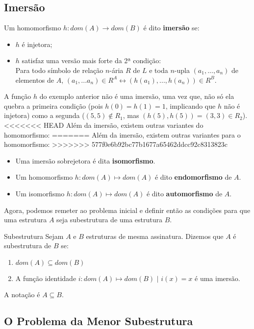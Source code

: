 \subsection{Imersão}
Um homomorfismo $h: dom(A) \rightarrow dom(B)$ é dito \textbf{imersão} se:
\begin{itemize}
    \item $h$ é injetora;
    \item $h$ satisfaz uma versão mais forte da 2ª condição:
    \\ Para todo símbolo de relação $n$-ária $R$ de $L$ e toda $n$-upla $(a_1,...,a_n)$ de elementos de $A$, $(a_1,...a_n) \in R^A \leftrightarrow (h(a_1),...,h(a_n)) \in R^B$.
\end{itemize}
A função $h$ do exemplo anterior não é uma imersão, uma vez que, não só ela quebra a primeira condição (pois $h(0) = h(1) = 1$, implicando que $h$ não é injetora) como a segunda ($(5,5) \notin R_1$, mas $(h(5),h(5)) = (3,3) \in R_2$).
<<<<<<< HEAD
Além da imersão, existem outras variantes do homomorfismo:
=======
Além da imersão, existem outras variantes para o homomorfismo:
>>>>>>> 577f0e6b92bc77b1677a65462ddcc92c8313823c
\begin{itemize}
    \item Uma imersão sobrejetora é dita \textbf{isomorfismo}.
    \item Um homomorfismo $h: dom(A) \mapsto dom(A)$ é dito \textbf{endomorfismo} de $A$.
    \item Um isomorfismo $h: dom(A) \mapsto dom(A)$ é dito \textbf{automorfismo} de $A$.
\end{itemize}

Agora, podemos remeter ao problema inicial e definir então as condições para que uma estrutura $A$ seja subestrutura de uma estrutura $B$.
\begin{definition}{Subestrutura}
    Sejam $A$ e $B$ estruturas de mesma assinatura. Dizemos que $A$ é subestrutura de $B$ se:
    \begin{enumerate}
        \item $dom(A) \subseteq dom(B)$
        \item A função identidade $i: dom(A) \mapsto dom(B)$ $|$ $i(x) = x$ é uma imersão.
    \end{enumerate}
    A notação é $A \subseteq B$.
\end{definition}

\subsection{O Problema da Menor Subestrutura}

